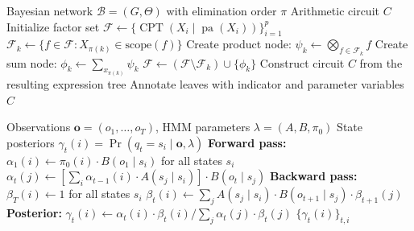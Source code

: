 \documentclass[11pt]{article}
\DeclareMathOperator{\Pr}{Pr}
\DeclareMathOperator{\pa}{pa}
\DeclareMathOperator{\CPT}{CPT}
\begin{document}
\begin{algorithm}[h]
\caption{Arithmetic Circuit Compilation}
\label{alg:ac}
\begin{algorithmic}[1]
\Require Bayesian network $\mathcal{B} = (G, \Theta)$ with elimination order $\pi$
\Ensure Arithmetic circuit $C$
\State Initialize factor set $\mathcal{F} \gets \{\CPT(X_i \mid \pa(X_i))\}_{i=1}^p$
  \State $\mathcal{F}_k \gets \{f \in \mathcal{F} : X_{\pi(k)} \in \text{scope}(f)\}$
  \State Create product node: $\psi_k \gets \bigotimes_{f \in \mathcal{F}_k} f$
  \State Create sum node: $\phi_k \gets \sum_{x_{\pi(k)}} \psi_k$
  \State $\mathcal{F} \gets (\mathcal{F} \setminus \mathcal{F}_k) \cup \{\phi_k\}$
\EndFor
\State Construct circuit $C$ from the resulting expression tree
\State Annotate leaves with indicator and parameter variables
\State \Return $C$
\end{algorithmic}
\end{algorithm}

\begin{algorithm}[h]
\caption{Forward--Backward HMM for Temporal Features}
\label{alg:hmm}
\begin{algorithmic}[1]
\Require Observations $\mathbf{o} = (o_1, \ldots, o_T)$, HMM parameters $\lambda = (A, B, \pi_0)$
\Ensure State posteriors $\gamma_t(i) = \Pr(q_t = s_i \mid \mathbf{o}, \lambda)$
\State \textbf{Forward pass:}
\State $\alpha_1(i) \gets \pi_0(i) \cdot B(o_1 \mid s_i)$ for all states $s_i$
  \State $\alpha_t(j) \gets \left[\sum_i \alpha_{t-1}(i) \cdot A(s_j \mid s_i)\right] \cdot B(o_t \mid s_j)$
\EndFor
\State \textbf{Backward pass:}
\State $\beta_T(i) \gets 1$ for all states $s_i$
  \State $\beta_t(i) \gets \sum_j A(s_j \mid s_i) \cdot B(o_{t+1} \mid s_j) \cdot \beta_{t+1}(j)$
\EndFor
\State \textbf{Posterior:}
  \State $\gamma_t(i) \gets \alpha_t(i) \cdot \beta_t(i) / \sum_j \alpha_t(j) \cdot \beta_t(j)$
\EndFor
\State \Return $\{\gamma_t(i)\}_{t,i}$
\end{algorithmic}
\end{algorithm}
\end{document}
